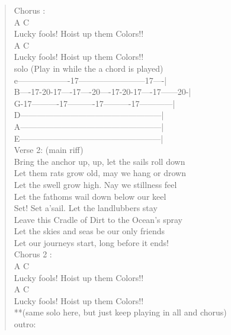 \documentclass[11pt]{article}
\begin{document}
\begin{verse}
Chorus :\\
\vspace*{1em}
A            C\\
Lucky fools! Hoist up them Colors!!\\
A            C\\
Lucky fools! Hoist up them Colors!!\\
\vspace*{1em}
solo (Play in while the a chord is played)\\
e-------------------17------------------------17----|\\
B----17-20-17----17----20----17-20-17----17------20-|\\
G-17----------17----------17----------17------------|\\
D---------------------------------------------------|\\
A---------------------------------------------------|\\
E---------------------------------------------------|\\
\vspace*{1em}
Verse 2: (main riff)\\
Bring the anchor up, up, let the sails roll down\\
Let them rats grow old, may we hang or drown\\
Let the swell grow high. Nay we stillness feel\\
Let the fathoms wail down below our keel\\
\vspace*{1em}
Set! Set a'sail. Let the landlubbers stay\\
Leave this Cradle of Dirt to the Ocean's spray\\
Let the skies and seas be our only friends\\
Let our journeys start, long before it ends!\\
\vspace*{1em}
Chorus 2 :\\
\vspace*{1em}
A            C\\
Lucky fools! Hoist up them Colors!!\\
A            C\\
Lucky fools! Hoist up them Colors!!\\
\vspace*{1em}
**(same solo here, but just keep playing in all and chorus)\\
\vspace*{1em}
outro:\\

\end{verse}
\end{document}
